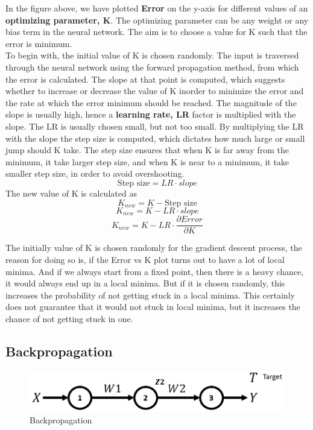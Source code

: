 \documentclass[12pt,a4paper,bold]{thesis}
\theoremstyle{thm}
\theoremstyle{definition}
\begin{document}
In the figure above, we have plotted \textbf{Error} on the y-axis for different values of an \textbf{optimizing parameter, K}. The optimizing parameter can be any weight or any bias term in the neural network. The aim is to choose a value for K such that the error is minimum. \\
To begin with, the initial value of K is chosen randomly. The input is traversed through the neural network using the forward propagation method, from which the error is calculated. The slope at that point is computed, which suggests whether to increase or decrease the value of K inorder to minimize the error and the rate at which the error minimum should be reached. The magnitude of the slope is usually high, hence a \textbf{learning rate, LR} factor is multiplied with the slope. The LR is usually chosen small, but not too small. By multiplying the LR with the slope the step size is computed, which dictates how much large or small jump should K take.
The step size ensures that when K is far away from the minimum, it take larger step size, and when K is near to a minimum, it take smaller step size, in order to avoid overshooting. 
\[\text{Step size} = LR \cdot slope\]
The new value of K is calculated as
\[K_{new}=K - \text{Step size}\]  
\[K_{new}=K - LR \cdot slope\]
\[K_{new}=K - LR \cdot \frac{\partial Error}{\partial K}\]


The initially value of K is chosen randomly for the gradient descent process, the reason for doing so is, if the Error vs K plot turns out to have a lot of local minima. And if we always start from a fixed point, then there is a heavy chance, it would always end up in a local minima. But if it is chosen randomly, this increases the probability of not getting stuck in a local minima. This certainly does not guarantee that it would not stuck in local minima, but it increases the chance of not getting stuck in one. 


\subsection{Backpropagation}
\begin{figure}[H]
	\centering
   \includegraphics[scale=0.56]{Images/38.png} 
   \caption{Backpropagation}
\end{figure}
\end{document}
